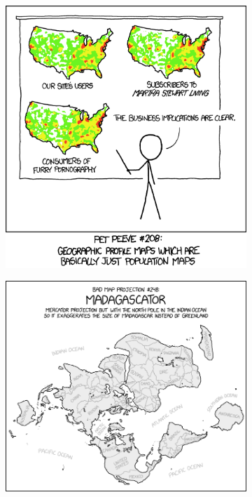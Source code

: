 \begin{figure}
\centering
\begin{subfigure}{.49\textwidth}
\centering
  \includegraphics[width=\textwidth]{xdcd_heatmap_2x.png}
\end{subfigure}
\hfill
\begin{subfigure}{.49\textwidth}
\centering
  \includegraphics[width=\textwidth]{xkcd_bad_map_projection_madagascator.png}

\end{subfigure}
\end{figure}
